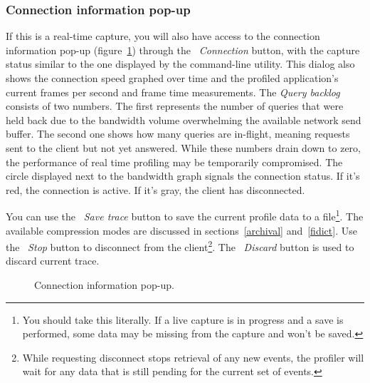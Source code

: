\documentclass[hidelinks,titlepage,a4paper]{article}
\begin{document}
\subsubsection{Connection information pop-up}
\label{connectionpopup}

If this is a real-time capture, you will also have access to the connection information pop-up (figure~\ref{connectioninfo}) through the \emph{\faWifi{}~Connection} button, with the capture status similar to the one displayed by the command-line utility. This dialog also shows the connection speed graphed over time and the profiled application's current frames per second and frame time measurements. The \emph{Query backlog} consists of two numbers. The first represents the number of queries that were held back due to the bandwidth volume overwhelming the available network send buffer. The second one shows how many queries are in-flight, meaning requests sent to the client but not yet answered. While these numbers drain down to zero, the performance of real time profiling may be temporarily compromised. The circle displayed next to the bandwidth graph signals the connection status. If it's red, the connection is active. If it's gray, the client has disconnected.

You can use the \faSave{}~\emph{Save trace} button to save the current profile data to a file\footnote{You should take this literally. If a live capture is in progress and a save is performed, some data may be missing from the capture and won't be saved.}. The available compression modes are discussed in sections~\ref{archival} and~\ref{fidict}. Use the \faPlug{}~\emph{Stop} button to disconnect from the client\footnote{While requesting disconnect stops retrieval of any new events, the profiler will wait for any data that is still pending for the current set of events.}. The \faExclamationTriangle{}~\emph{Discard} button is used to discard current trace.

\begin{figure}[h]
\centering{}
\caption{Connection information pop-up.}
\label{connectioninfo}
\end{figure}
\end{document}
